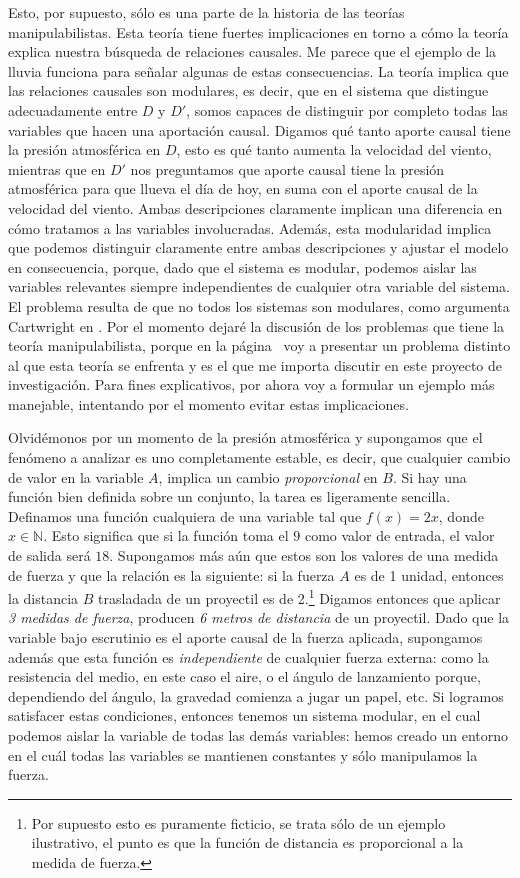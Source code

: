 Esto, por supuesto, sólo es una parte de la historia de las
teorías manipulabilistas. Esta teoría tiene fuertes
implicaciones en torno a cómo la teoría explica nuestra
búsqueda de relaciones causales. Me parece que el ejemplo
de la lluvia funciona para señalar algunas de estas
consecuencias. La teoría implica que las relaciones causales
son modulares, es decir, que en el sistema que distingue
adecuadamente entre $D$ y $D'$, somos capaces de
distinguir por completo todas las variables que hacen una
aportación causal. Digamos qué tanto aporte causal tiene la
presión atmosférica en $D$, esto es qué tanto aumenta la
velocidad del viento, mientras que en $D'$ nos preguntamos
que aporte causal tiene la presión atmosférica para que
llueva el día de hoy, en suma con el aporte causal de la
velocidad del viento. Ambas descripciones claramente
implican una diferencia en cómo tratamos a las variables
involucradas. Además, esta modularidad implica que podemos
distinguir claramente entre ambas descripciones y ajustar el
modelo en consecuencia, porque, dado que el sistema es
modular, podemos aislar las variables relevantes siempre
independientes de cualquier otra variable del sistema. El
problema resulta de que no todos los sistemas son modulares,
como argumenta Cartwright en \parencite{Cartwright2002}. Por
el momento dejaré la discusión de los problemas que tiene
la teoría manipulabilista, porque en la página~\pageref{pii}
voy a presentar un problema distinto al que esta teoría se
enfrenta y es el que me importa discutir en este proyecto de
investigación. Para fines explicativos, por ahora voy a formular
un ejemplo más manejable, intentando por el momento evitar
estas implicaciones.    

Olvidémonos por un momento de la
presión atmosférica y supongamos que el fenómeno a analizar
es uno completamente estable, es decir, que cualquier cambio
de valor en la variable $ A $, implica un cambio
\emph{proporcional} en $ B $. Si hay una función bien
definida sobre un conjunto, la tarea es ligeramente
sencilla. Definamos una función cualquiera de una variable
tal que $ f(x) = 2x $, donde $ x \in  \mathbb{N} $. Esto
significa que si la función toma el $ 9 $ como valor de
entrada, el valor de salida será $ 18 $. Supongamos más aún
que estos son los valores de una medida de fuerza y que la
relación es la siguiente: si la fuerza $ A $ es de 1 unidad,
entonces la distancia $ B $ trasladada de un proyectil es de
2.\footnote{ 
	Por supuesto esto es puramente ficticio, se
	trata sólo de un ejemplo ilustrativo, el punto es
	que la función de distancia es proporcional a la
	medida de fuerza.
} 
Digamos entonces que aplicar \emph{3 medidas de fuerza},
producen \emph{6 metros de distancia} de un proyectil. Dado
que la variable bajo escrutinio es el aporte causal de la
fuerza aplicada, supongamos además que esta función es
\emph{independiente} de cualquier fuerza externa: como  la
resistencia del medio, en este caso el aire, o el ángulo de
lanzamiento porque, dependiendo del ángulo, la gravedad
comienza a jugar un papel, etc. Si logramos satisfacer estas
condiciones, entonces tenemos un sistema modular, en el cual
podemos aislar la variable  de todas las demás
variables: hemos creado un entorno en el cuál todas las
variables se mantienen constantes y sólo manipulamos la
fuerza.

